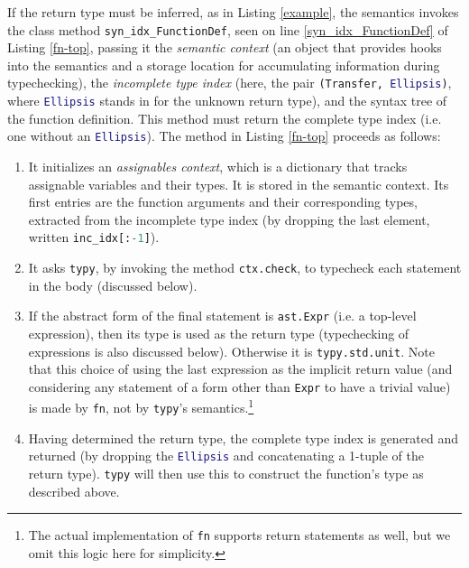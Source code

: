 \documentclass[preprint,10pt]{sigplanconf}
\newcommand{\lip}[1]{\lstinline[language=Python,basicstyle=\ttfamily\small,deletendkeywords={tuple,buffer,map}]{#1}}
\begin{document}
If the return type must be inferred, as in Listing \ref{example}, the semantics invokes the class method \lip{syn_idx_FunctionDef}, seen on line \ref{syn_idx_FunctionDef} of Listing \ref{fn-top}, passing it the \emph{semantic context} (an object that provides hooks into the semantics and a storage location for accumulating information during typechecking), the \emph{incomplete type index} (here, the pair \lip{(Transfer, Ellipsis)}, where \lip{Ellipsis} stands in for the unknown return type), and the syntax tree of the function definition. This method must return the complete type index (i.e. one without an \lip{Ellipsis}). The method in Listing \ref{fn-top} proceeds as follows: \begin{enumerate}
\item It initializes an \emph{assignables context}, which is a dictionary that  tracks assignable variables and their types. It is stored in the semantic context. Its first entries are the function arguments and their corresponding types, extracted from the incomplete type index (by dropping the last element, written \lip{inc_idx[:-1]}).
\item It asks \lip{typy}, by invoking the method \lip{ctx.check}, to typecheck each statement in the body (discussed below).
\item If the abstract form of the final statement is \lip{ast.Expr} (i.e. a top-level expression), then its type is used as the return type (typechecking of expressions is also discussed below). Otherwise it is \lip{typy.std.unit}. Note that this choice of using the last expression as the implicit return value (and considering any statement of a form other than \lip{Expr} to have a trivial value) is made by \verb|fn|, not by \lip{typy}'s semantics.\footnote{The actual implementation of \texttt{fn} supports return statements as well, but we omit this logic here for simplicity.} %
\item Having determined the return type, the complete type index is  generated and returned (by dropping the \lip{Ellipsis} and concatenating a 1-tuple of the return type). \verb|typy| will then use this to construct the function's type as described above.
\end{enumerate}%
\end{document}
